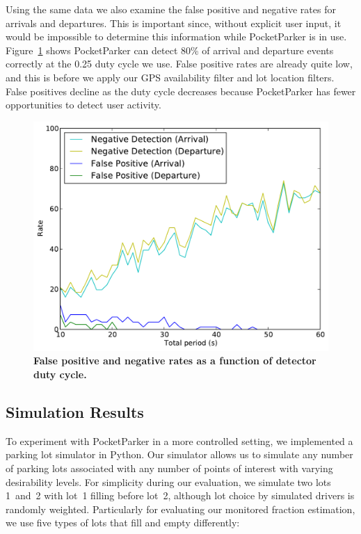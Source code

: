 \documentclass{sigchi}
\begin{document}
Using the same data we also examine the false positive and negative rates for
arrivals and departures. This is important since, without explicit user
input, it would be impossible to determine this information while
PocketParker is in use. Figure~\ref{fig-falsepositives} shows PocketParker
can detect 80\% of arrival and departure events correctly at the 0.25 duty
cycle we use. False positive rates are already quite low, and this is before
we apply our GPS availability filter and lot location filters. False
positives decline as the duty cycle decreases because PocketParker has fewer
opportunities to detect user activity.
\begin{figure}[t]
\centering
\includegraphics[width=\columnwidth]{./figures/Rate_FP_and_ND.pdf}

\caption{\textbf{False positive and negative rates as a function of detector
duty cycle.}} 

\label{fig-falsepositives}
\end{figure}

\subsection{Simulation Results}

To experiment with PocketParker in a more controlled setting, we implemented
a parking lot simulator in Python. Our simulator allows us to simulate any
number of parking lots associated with any number of points of interest with
varying desirability levels. For simplicity during our evaluation, we
simulate two lots 1~and~2 with lot~1 filling before lot~2, although lot
choice by simulated drivers is randomly weighted. Particularly for evaluating
our monitored fraction estimation, we use five types of lots that fill and
empty differently:
\end{document}
